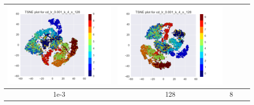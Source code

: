 \documentclass[12pt]{report}
\begin{document}
\begin{table}[H]
\begin{tabular}{ | c | c | c | c || c |}
\begin{minipage}{.3\textwidth}
      \includegraphics[scale=0.25]{cd_lr_0_001_k_4_n_128.png}
    \end{minipage} &
    \begin{minipage}{.3\textwidth}
      \includegraphics[scale=0.25]{test_cd_lr_0_001_k_4_n_128.png}
    \end{minipage}
        \\ \hline
    1e-3 & 128 & 8 &
    \begin{minipage}{.3\textwidth}

\end{minipage}
\end{tabular}
\end{table}
\end{document}
